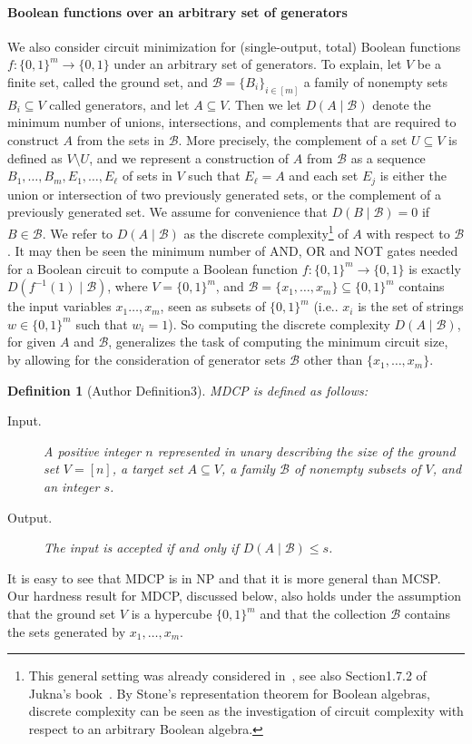 \documentclass[10pt,a4paper]{article}
\newtheorem{ntdefinition}[nttheorem]{Definition}
\begin{document}
\paragraph{Boolean functions over an arbitrary set of generators}
We also consider circuit minimization for (single-output, total) Boolean functions $f:\{0,1\}^m\to\{0,1\}$ under an arbitrary set of generators.
To explain, let $V$ be a finite set, called the ground set, and $\mathcal B=\{B_i\}_{i\in[m]}$ a family of nonempty sets $B_i\subseteq V$ called generators, and let $A\subseteq V$. Then we let $D(A\mid\mathcal B)$ denote the minimum number of unions, intersections, and complements that are required to construct $A$ from the sets in $\mathcal B$. More precisely, the complement of a set $U\subseteq V$ is defined as $V\setminus U$, and we represent a construction of $A$ from $\mathcal B$ as a sequence $B_1,\ldots,B_m,E_1,\ldots,E_\ell$ of sets in $V$ such that $E_\ell=A$ and each set $E_j$ is either the union or intersection of two previously generated sets, or the complement of a previously generated set. We assume for convenience that $D(B\mid\mathcal B)=0$ if $B\in\mathcal B$. We refer to $D(A\mid\mathcal B)$ as the discrete complexity\footnote{This general setting was already considered in~\cite{ref68}, see also Section1.7.2 of Jukna's book~\cite{ref42}. By Stone's representation theorem for Boolean algebras, discrete complexity can be seen as the investigation of circuit complexity with respect to an arbitrary Boolean algebra.} of $A$ with respect to $\mathcal B$.
It may then be seen the minimum number of AND, OR and NOT gates needed for a Boolean circuit to compute a Boolean function $f:\{0,1\}^m\to\{0,1\}$ is exactly $D(f^{-1}(1)\mid\mathcal B)$, where $V=\{0,1\}^m$, and $\mathcal B=\{x_1,\ldots,x_m\}\subseteq\{0,1\}^m$ contains the input variables $x_1\ldots,x_m$, seen as subsets of $\{0,1\}^m$ (i.e.. $x_i$ is the set of strings $w\in\{0,1\}^m$ such that $w_i=1$). So computing the discrete complexity $D(A\mid\mathcal B)$, for given $A$ and $\mathcal B$, generalizes the task of computing the minimum circuit size, by allowing for the consideration of generator sets $\mathcal B$ other than $\{x_1,\ldots,x_m\}$.
\setcounter{nttheorem}{2}
\begin{ntdefinition}[Author Definition3]
MDCP is defined as follows:
\begin{description}
\item[Input.] A positive integer $n$ represented in unary describing the size of the ground set $V=[n]$, a target set $A\subseteq V$, a family $\mathcal B$ of nonempty subsets of $V$, and an integer $s$.
\item[Output.] The input is accepted if and only if $D(A\mid\mathcal B)\leq s$.
\end{description}
\end{ntdefinition}
It is easy to see that MDCP is in NP and that it is more general than MCSP. Our hardness result for MDCP, discussed below, also holds under the assumption that the ground set $V$ is a hypercube $\{0,1\}^m$ and that the collection $\mathcal B$ contains the sets generated by $x_1,\ldots,x_m$.
\end{document}
